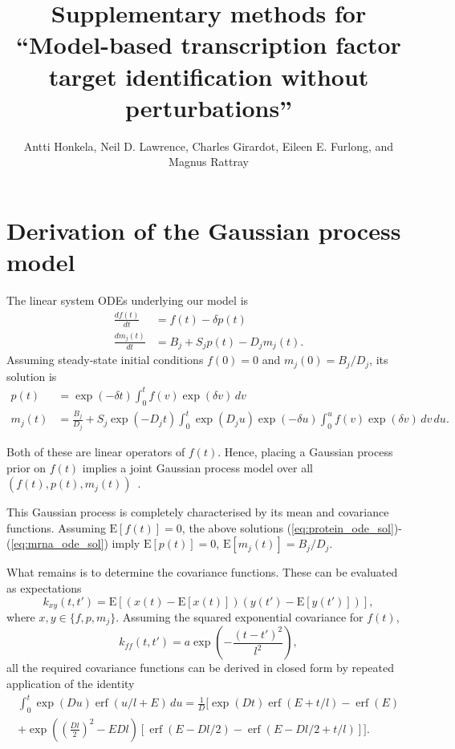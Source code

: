 \documentclass{article}
\title{Supplementary methods for ``Model-based transcription factor
  target identification without perturbations''}
\author{
Antti Honkela,
Neil D. Lawrence,
Charles Girardot, 
Eileen E. Furlong, and
Magnus Rattray
}
\newcommand{\erf}{\operatorname{erf}}
\begin{document}
\maketitle


\section{Derivation of the Gaussian process model}

The linear system ODEs underlying our model is
\begin{align}
  \label{eq:translation_ode}
  \frac{df(t)}{dt} & = f(t) - \delta p(t) \\
  \label{eq:translation_ode}
  \frac{dm_j(t)}{dt} & = B_j + S_j p(t) - D_j m_j(t).
\end{align}
Assuming steady-state initial conditions $f(0) = 0$ and
$m_j(0) = B_j / D_j$, its solution is
\begin{align}
  \label{eq:protein_ode_sol}
  p(t) & = \exp(-\delta t) \int_0^t f(v) \exp(\delta v) \, dv \\
  \label{eq:mrna_ode_sol}
  m_j(t) & = \frac{B_j}{D_j} + S_j \exp(-D_j t) \int_0^t \exp(D_j
  u) \exp(-\delta u) \int_0^u f(v) \exp(\delta v) \, dv \, du.
\end{align}

Both of these are linear operators of $f(t)$.  Hence, placing a
Gaussian process prior on $f(t)$ implies a joint Gaussian process
model over all $(f(t), p(t), m_j(t))$~\cite{Rasmussen2006}.

This Gaussian process is completely characterised by its mean and
covariance functions.  Assuming $\mathrm{E}[f(t)] = 0$, the above
solutions (\ref{eq:protein_ode_sol})-(\ref{eq:mrna_ode_sol}) imply
$\mathrm{E}[p(t)] = 0$, $\mathrm{E}[m_j(t)] = B_j / D_j$.

What remains is to determine the covariance functions.  These can
be evaluated as expectations
\begin{equation}
  \label{eq:kernel_definition}
  k_{xy}(t,t') = \mathrm{E}[(x(t) - \mathrm{E}[x(t)])(y(t') - \mathrm{E}[y(t')])],
\end{equation}
where $x,y \in \{f, p, m_j\}$.  Assuming the squared exponential
covariance for $f(t)$,
\begin{equation}
  \label{eq:sqexp_kernel}
  k_{ff}(t, t') = a \exp\left( -\frac{(t-t')^2}{l^2} \right),
\end{equation}
all the required covariance functions can be derived in closed form
by repeated application of the identity
\begin{multline}
  \label{eq:gpsim_identity}
  \int_0^t \exp(D u) \erf(u/l + E)\,du =
  \frac{1}{D} \bigg[
  \exp(Dt) \erf(E + t/l) - \erf(E) \\
  + \exp\left(\left( \frac{Dl}{2}\right)^2 -E Dl \right)
  [ \erf(E - Dl/2) - \erf(E-Dl/2+t/l) ]
  \bigg].
\end{multline}
\end{document}
